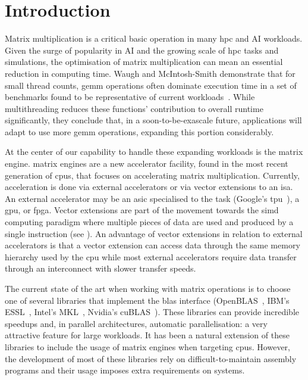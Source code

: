 \documentclass[\main/thesis.tex]{subfiles}
\begin{document}
\chapter{Introduction}
\label{cha:intro}

Matrix multiplication is a critical basic operation in many \gls{hpc} and AI workloads.
Given the surge of popularity in AI and the growing scale of \gls{hpc} tasks and simulations, the optimisation of matrix multiplication can mean an essential reduction in computing time.
Waugh and McIntosh-Smith demonstrate that for small thread counts, \gls{gemm} operations often dominate execution time in a set of benchmarks found to be representative of current workloads~\autocite{waugh2020use}.
While multithreading reduces these functions' contribution to overall runtime significantly, they conclude that, in a soon-to-be-exascale future, applications will adapt to use more \gls{gemm} operations, expanding this portion considerably.

At the center of our capability to handle these expanding workloads is the \gls{matrix engine}.
\Glspl{matrix engine} are a new accelerator facility, found in the most recent generation of \glspl{cpu}, that focuses on accelerating matrix multiplication.
Currently, acceleration is done via external accelerators or via vector extensions to an \gls{isa}.
An external accelerator may be an \gls{asic} specialised to the task (\eg Google\texttrademark{}'s \gls{tpu}\texttrademark{}~\autocite{abadi2016tensorflow}), a \gls{gpu}, or  \gls{fpga}.
Vector extensions are part of the movement towards the \gls{simd} computing paradigm where multiple pieces of data are used and produced by a single instruction (see ).
An advantage of vector extensions in relation to external accelerators is that a vector extension can access data through the same memory hierarchy used by the \gls{cpu} while most external accelerators require data transfer through an interconnect with slower transfer speeds.

The current state of the art when working with matrix operations is to choose one of several libraries that implement the \gls{blas} interface (\eg OpenBLAS~\autocite{xianyi2012model}, IBM's ESSL~\autocite{ibm2021engineering}, Intel\textsuperscript{\textregistered{}}'s MKL~\autocite{wang2014intel,intel2021accelerate}, Nvidia\textsuperscript{\textregistered{}}'s cuBLAS~\autocite{nvidia2021cublas}).
These libraries can provide incredible speedups and, in parallel architectures, automatic parallelisation: a very attractive feature for large workloads.
It has been a natural extension of these libraries to include the usage of matrix engines when targeting \glspl{cpu}.
However, the development of most of these libraries rely on difficult-to-maintain assembly programs and their usage imposes extra requirements on systems.
\end{document}
